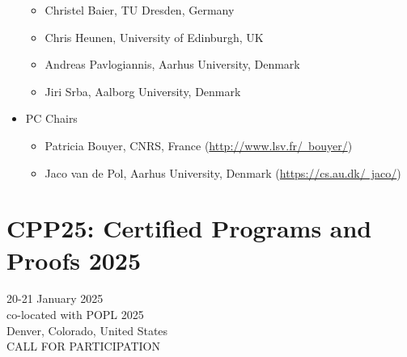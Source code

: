 \documentclass[prodmode,acmtecs]{acmsmall} %
\begin{document}
\begin{itemize}
\begin{itemize}\item  Christel Baier, TU Dresden, Germany
\item  Chris Heunen, University of Edinburgh, UK
\item  Andreas Pavlogiannis, Aarhus University, Denmark
\item  Jiri Srba, Aalborg University, Denmark
\end{itemize} 
\item  PC Chairs 
 
\begin{itemize}\item  Patricia Bouyer, CNRS, France (\href{http://www.lsv.fr/~bouyer/}{http://www.lsv.fr/~bouyer/})
\item  Jaco van de Pol, Aarhus University, Denmark (\href{https://cs.au.dk/~jaco/}{https://cs.au.dk/~jaco/})
\end{itemize} 
\end{itemize}\section{CPP25: Certified Programs and Proofs 2025}\label{CPP25}  20-21 January 2025\\ 
  co-located with POPL 2025\\ 
  Denver, Colorado, United States\\ 
CALL FOR PARTICIPATION 
\end{document}
